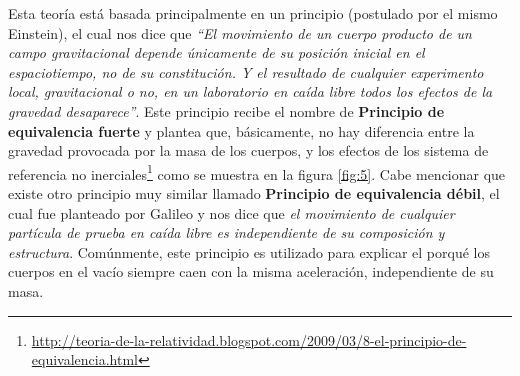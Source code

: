 Esta teoría está basada principalmente en un principio (postulado por el mismo Einstein), el cual nos dice que \textit{``El movimiento de un cuerpo producto de un campo gravitacional depende únicamente de su posición inicial en el espaciotiempo, no de su constitución. Y el resultado de cualquier experimento local, gravitacional o no, en un laboratorio en caída libre todos los efectos de la gravedad desaparece''}. Este principio recibe el nombre de \textbf{Principio de equivalencia fuerte} y plantea que, básicamente, no hay diferencia entre la gravedad provocada por la masa de los cuerpos, y los efectos de los sistema de referencia no inerciales\footnote{\url{http://teoria-de-la-relatividad.blogspot.com/2009/03/8-el-principio-de-equivalencia.html}} como se muestra en la figura \ref{fig:5}. Cabe mencionar que existe otro principio muy similar llamado \textbf{Principio de equivalencia débil}, el cual fue planteado por Galileo y nos dice que \textit{el movimiento de cualquier partícula de prueba en caída libre es independiente de su composición y estructura}. Comúnmente, este principio es utilizado para explicar el porqué los cuerpos en el vacío siempre caen con la misma aceleración, independiente de su masa.
